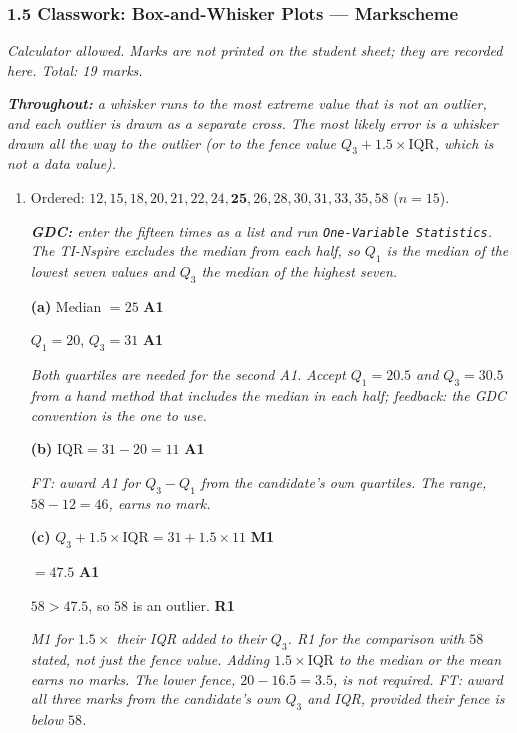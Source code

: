 \documentclass[12pt, twoside]{article}
\begin{document}
\subsubsection*{1.5 Classwork: Box-and-Whisker Plots --- Markscheme}

\emph{Calculator allowed. Marks are not printed on the student sheet; they are
recorded here. Total: 19 marks.}

\emph{\textbf{Throughout:} a whisker runs to the most extreme value that is
\emph{not} an outlier, and each outlier is drawn as a separate cross. The most
likely error is a whisker drawn all the way to the outlier (or to the fence
value $Q_{3} + 1.5 \times \text{IQR}$, which is not a data value).}

\begin{enumerate}[itemsep=0.3cm]

\item[1.] [Maximum mark: 9]

Ordered: $12, 15, 18, 20, 21, 22, 24, \mathbf{25}, 26, 28, 30, 31, 33, 35,
58$ \quad ($n = 15$).

\emph{\textbf{GDC:} enter the fifteen times as a list and run
\texttt{One-Variable Statistics}. The TI-Nspire excludes the median from each
half, so $Q_{1}$ is the median of the lowest seven values and $Q_{3}$ the
median of the highest seven.}

\textbf{(a)} Median $= 25$ \hfill \textbf{A1}

$Q_{1} = 20$, \quad $Q_{3} = 31$ \hfill \textbf{A1}

\emph{Both quartiles are needed for the second A1. Accept $Q_{1} = 20.5$ and
$Q_{3} = 30.5$ from a hand method that includes the median in each half;
feedback: the GDC convention is the one to use.}

\textbf{(b)} $\text{IQR} = 31 - 20 = 11$ \hfill \textbf{A1}

\emph{FT: award A1 for $Q_{3} - Q_{1}$ from the candidate's own quartiles.
The range, $58 - 12 = 46$, earns no mark.}

\textbf{(c)} $Q_{3} + 1.5 \times \text{IQR} = 31 + 1.5 \times 11$
\hfill \textbf{M1}

$= 47.5$ \hfill \textbf{A1}

$58 > 47.5$, so $58$ is an outlier. \hfill \textbf{R1}

\emph{M1 for $1.5 \times$ their IQR added to their $Q_{3}$. R1 for the
comparison with $58$ stated, not just the fence value. Adding
$1.5 \times \text{IQR}$ to the median or the mean earns no marks. The lower
fence, $20 - 16.5 = 3.5$, is not required. FT: award all three marks from the
candidate's own $Q_{3}$ and IQR, provided their fence is below $58$.}


\end{enumerate}
\end{document}
